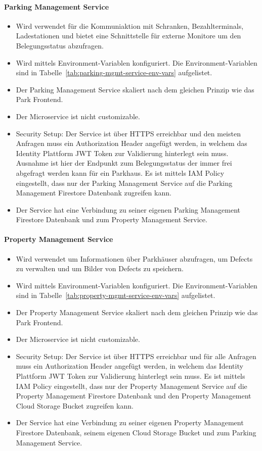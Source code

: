 \paragraph{Parking Management Service}
\begin{itemize}
	\item Wird verwendet für die Kommuniaktion mit Schranken, Bezahlterminals, Ladestationen und bietet eine Schnittstelle für externe Monitore um den Belegungsstatus abzufragen.
	\item Wird mittels Environment-Variablen konfiguriert. Die Environment-Variablen sind in Tabelle~\ref{tab:parking-mgmt-service-env-vars} aufgelistet.
	\item Der Parking Management Service skaliert nach dem gleichen Prinzip wie das Park Frontend.
	\item Der Microservice ist nicht customizable.
	\item Security Setup: Der Service ist über HTTPS erreichbar und den meisten Anfragen muss ein Authorization Header angefügt werden, in welchem das Identity Plattform JWT Token zur Validierung hinterlegt sein muss. Ausnahme ist hier der Endpunkt zum Belegungsstatus der immer frei abgefragt werden kann für ein Parkhaus. Es ist mittels IAM Policy eingestellt, dass nur der Parking Management Service auf die Parking Management Firestore Datenbank zugreifen kann.
	\item Der Service hat eine Verbindung zu seiner eigenen Parking Management Firestore Datenbank und zum Property Management Service.
\end{itemize}

\paragraph{Property Management Service}
\begin{itemize}
	\item Wird verwendet um Informationen über Parkhäuser abzufragen, um Defects zu verwalten und um Bilder von Defects zu speichern.
	\item Wird mittels Environment-Variablen konfiguriert. Die Environment-Variablen sind in Tabelle~\ref{tab:property-mgmt-service-env-vars} aufgelistet.
	\item Der Property Management Service skaliert nach dem gleichen Prinzip wie das Park Frontend.
	\item Der Microservice ist nicht customizable.
	\item Security Setup: Der Service ist über HTTPS erreichbar und für alle Anfragen muss ein Authorization Header angefügt werden, in welchem das Identity Plattform JWT Token zur Validierung hinterlegt sein muss. Es ist mittels IAM Policy eingestellt, dass nur der Property Management Service auf die Property Management Firestore Datenbank und den Property Management Cloud Storage Bucket zugreifen kann.
	\item Der Service hat eine Verbindung zu seiner eigenen Property Management Firestore Datenbank, seinem eigenen Cloud Storage Bucket und zum Parking Management Service.
\end{itemize}

